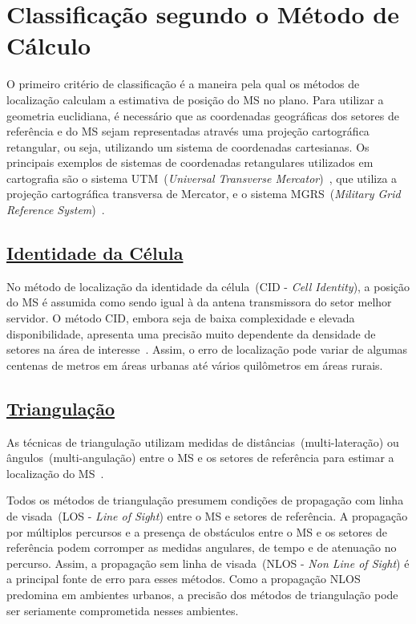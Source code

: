 \section{\textbf{Classificação segundo o Método de Cálculo}}
\label{sec:Cap1Metodo}

O primeiro critério de classificação é a maneira pela qual os métodos de localização calculam a estimativa de posição do MS no plano. Para utilizar a geometria euclidiana, é necessário que as coordenadas geográficas dos setores de referência e do MS sejam representadas através uma projeção cartográfica retangular, ou seja, utilizando um sistema de coordenadas cartesianas. Os principais exemplos de sistemas de coordenadas retangulares utilizados em cartografia são o sistema UTM~(\textit{Universal Transverse Mercator})~\cite{Geocartografia}, que utiliza a projeção cartográfica transversa de Mercator, e o sistema MGRS~(\textit{Military Grid Reference System})~\cite{MGRS}.

\subsection{\underline{Identidade da Célula}}
\label{subsec:Cap1Cid}

No método de localização da identidade da célula~(CID - \textit{Cell Identity}), a posição do MS é assumida como sendo igual à da antena transmissora do setor melhor servidor. O método CID, embora seja de baixa complexidade e elevada disponibilidade, apresenta uma precisão muito dependente da densidade de setores na área de interesse~\cite{SPAWC2008}. Assim, o erro de localização pode variar de algumas centenas de metros em áreas urbanas até vários quilômetros em áreas rurais.

\subsection{\underline{Triangulação}}
\label{subsec:Cap1Triangulacao}

As técnicas de triangulação utilizam medidas de distâncias~(multi-lateração) ou ângulos~(multi-angulação) entre o MS e os setores de referência para estimar a localização do MS~\cite{LocationMethodsSurvey2007}.

Todos os métodos de triangulação presumem condições de propagação com linha de visada~(LOS - \textit{Line of Sight}) entre o MS e setores de referência. A propagação por múltiplos percursos e a presença de obstáculos entre o MS e os setores de referência podem corromper as medidas angulares, de tempo e de atenuação no percurso. Assim, a propagação sem linha de visada~(NLOS - \textit{Non Line of Sight}) é a principal fonte de erro para esses métodos. Como a propagação NLOS predomina em ambientes urbanos, a precisão dos métodos de triangulação pode ser seriamente comprometida nesses ambientes.


